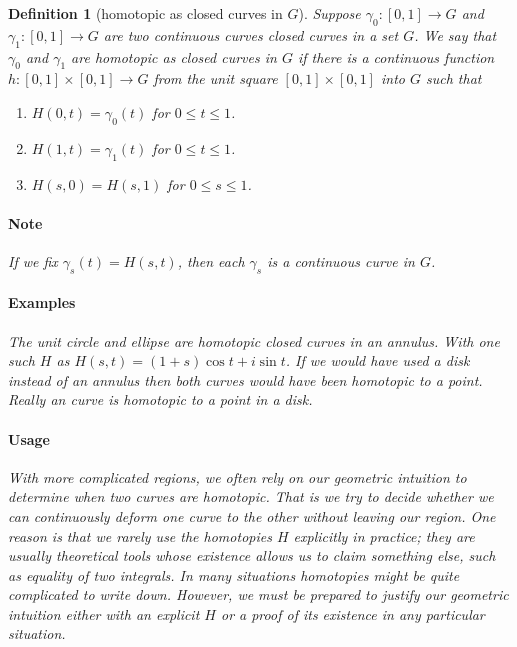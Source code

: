 \documentclass[a4paper]{article}
\newtheorem{definition}{Definition}
\begin{document}
\begin{definition}[homotopic as closed curves in \(G\)]
  Suppose \(\gamma_0 : [0, 1] \to G \) and \(\gamma_1 : [0, 1] \to G \) are two continuous curves closed curves in a set \(G\). 
  We say that \(\gamma_0\) and \(\gamma_1\) are homotopic as closed curves in \(G\) if there is a continuous function \(h : [0, 1] \times [0, 1] \to G\) from the unit square \([0, 1] \times [0, 1]\) into \(G\) such that
  \begin{enumerate}
    \item \(H(0, t) = \gamma_0(t)\) for \(0 \leq t \leq 1\).
    \item \(H(1, t) = \gamma_1(t)\) for \(0 \leq t \leq 1\).
    \item \(H(s, 0) = H(s, 1)\) for \(0 \leq s \leq 1\).
  \end{enumerate}
  \paragraph{Note}
  If we fix \(\gamma_s(t) = H(s, t)\), then each \(\gamma_s\) is a continuous curve in \(G\). 

  \paragraph{Examples}
  The unit circle and ellipse are homotopic closed curves in an annulus. With one such \(H\) as \(H(s, t) = (1 + s) \cos t + i \sin t\). 
  If we would have used a disk instead of an annulus then both curves would have been homotopic to a point. Really an curve is homotopic to a point in a disk. 

  \paragraph{Usage}
  With more complicated regions, we often rely on our geometric intuition to determine when two curves are homotopic. 
  That is we try to decide whether we can continuously deform one curve to the other without leaving our region. 
  One reason is that we rarely use the homotopies \(H\) explicitly in practice; they are usually theoretical tools whose existence allows us to claim something else, such as equality of two integrals.
  In many situations homotopies might be quite complicated to write down.
  However, we must be prepared to justify our geometric intuition either with an explicit \(H\) or a proof of its existence in any particular situation. 


\end{definition}
\end{document}

